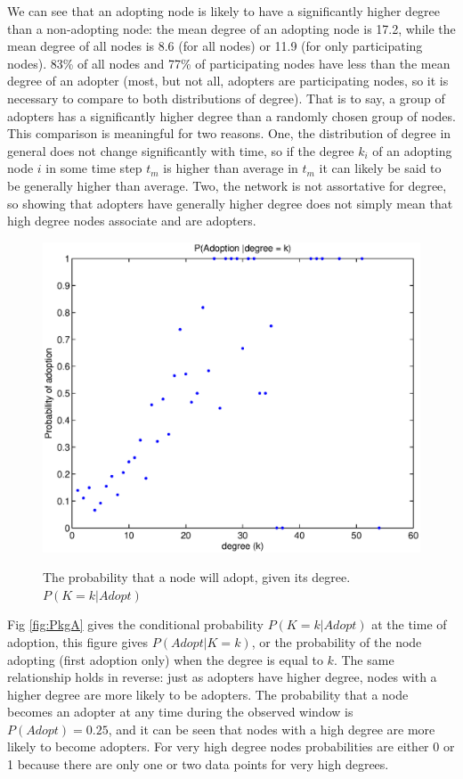 \documentclass[12pt]{article}
\begin{document}
We can see that an adopting node is likely to have a significantly higher degree than a non-adopting node: the mean degree of an adopting node is 17.2, while the mean degree of all nodes is 8.6 (for all nodes) or 11.9 (for only participating nodes). 83\% of all nodes and 77\% of participating nodes have less than the mean degree of an adopter (most, but not all,  adopters are participating nodes, so it is necessary to compare to both distributions of degree). That is to say, a group of adopters has a significantly higher degree than a randomly chosen group of nodes. \newline This comparison is meaningful for two reasons. One, the distribution of degree in general does not change significantly with time, so if the degree \(k_i\) of an adopting node \(i\) in some time step \(t_m\) is higher than average in \(t_m\) it can likely be said to be generally higher than average. Two, the network is not assortative for degree, so showing that adopters have generally higher degree does not simply mean that high degree nodes associate and are adopters.

\begin{figure}[H]
\includegraphics[trim = 0cm 0cm 0cm 0cm, width = .9\textwidth]{Graficos/ProbAgk.eps}
\label{fig:ProbAgk}
\caption{The probability that a node will adopt, given its degree. \(P(K = k | Adopt)\) }
\end{figure}

Fig \ref{fig:PkgA} gives the conditional probability \(P(K = k | Adopt)\) at the time of adoption, this figure gives \(P(Adopt | K = k)\), or the probability of the node adopting (first adoption only) when the degree is equal to \(k\). The same relationship holds in reverse: just as adopters have higher degree, nodes with a higher degree are more likely to be adopters. The probability that a node becomes an adopter at any time during the observed window is \(P(Adopt) = 0.25\), and it can be seen that nodes with a high degree are more likely to become adopters. For very high degree nodes probabilities are either 0 or 1 because there are only one or two data points for very high degrees.
\end{document}
